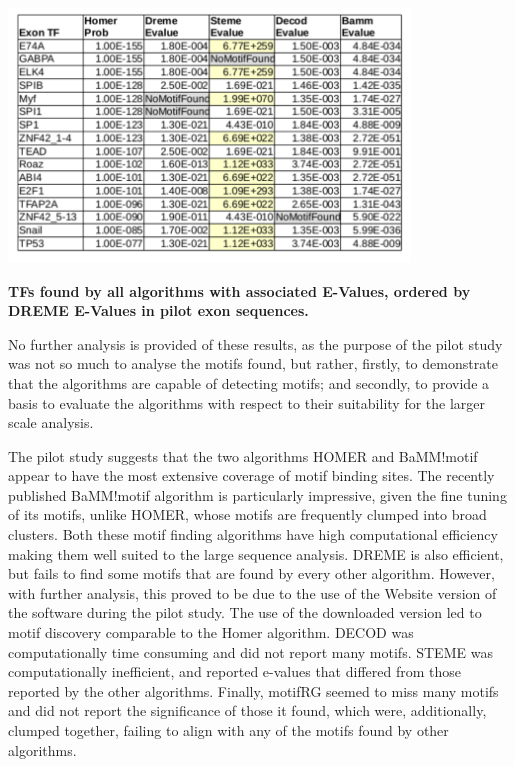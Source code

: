 \documentclass[12pt]{article}
\begin{document}
\begin{table}[!htbp]
\centering
\includegraphics[width=0.8\textwidth]{exonAllAlgorithmEValues.pdf} 
\caption{{\bf TFs found by all algorithms with associated E-Values, ordered by DREME E-Values in pilot exon sequences.}}\label{motif_evalue_summary_exons}
\end{table}

No further analysis is provided of these results, as the purpose of the pilot study was not so much to analyse the motifs found, but rather, firstly, to demonstrate that the algorithms are capable of detecting motifs; and secondly, to provide a basis to evaluate the algorithms with respect to their suitability for the larger scale analysis.

The pilot study suggests that the two algorithms HOMER and BaMM!motif appear to have the most extensive coverage of motif binding sites. The recently published BaMM!motif algorithm is particularly impressive, given the fine tuning of its motifs, unlike HOMER, whose motifs are frequently clumped into broad clusters. Both these motif finding algorithms have high computational efficiency making them well suited to the large sequence analysis. DREME is also 
efficient, but fails to find some motifs that are found by every other algorithm. However, with further analysis, this proved to be due to the use of the Website version of the software during the pilot study. The use of the downloaded version led to motif discovery comparable to the Homer algorithm. DECOD was computationally time consuming and did not report many motifs. STEME was computationally inefficient, and reported e-values that differed from those reported by the other algorithms. Finally, motifRG seemed to miss many motifs and did not report the significance of those it found, which were, additionally, clumped together, failing to align with any of the motifs found by other algorithms. 
\end{document}

